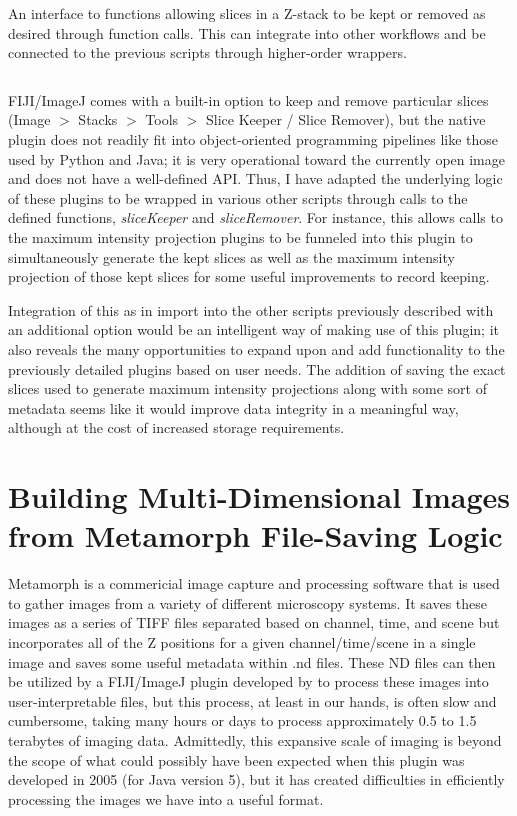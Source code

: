 \begin{code}
\caption{An interface to functions allowing slices in a Z\hyp{}stack to be kept or removed as desired through function calls. This can integrate into other workflows and be connected to the previous scripts through higher\hyp{}order wrappers.}
\label{reslicer}

\inputminted[breaklines,frame=single,fontsize=\small]{python}{source/reSlicer.py}

\end{code}

FIJI/ImageJ comes with a built\hyp{}in option to keep and remove particular slices (Image $>$ Stacks $>$ Tools $>$ Slice Keeper / Slice Remover), but the native plugin does not readily fit into object\hyp{}oriented programming pipelines like those used by Python and Java; it is very operational toward the currently open image and does not have a well\hyp{}defined API. Thus, I have adapted the underlying logic of these plugins to be wrapped in various other scripts through calls to the defined functions, \textit{sliceKeeper} and \textit{sliceRemover}. For instance, this allows calls to the maximum intensity projection plugins to be funneled into this plugin to simultaneously generate the kept slices as well as the maximum intensity projection of those kept slices for some useful improvements to record keeping. 

Integration of this as in import into the other scripts previously described with an additional option would be an intelligent way of making use of this plugin; it also reveals the many opportunities to expand upon and add functionality to the previously detailed plugins based on user needs. The addition of saving the exact slices used to generate maximum intensity projections along with some sort of metadata seems like it would improve data integrity in a meaningful way, although at the cost of increased storage requirements.

\section{Building Multi\hyp{}Dimensional Images from Metamorph File\hyp{}Saving Logic}\label{metamorph}

Metamorph is a commericial image capture and processing software that is used to gather images from a variety of different microscopy systems. It saves these images as a series of TIFF files separated based on channel, time, and scene but incorporates all of the Z positions for a given channel/time/scene in a single image and saves some useful metadata within .nd files. These ND files can then be utilized by a FIJI/ImageJ plugin developed by \citet{Cordelieres2005} to process these images into user\hyp{}interpretable files, but this process, at least in our hands, is often slow and cumbersome, taking many hours or days to process approximately 0.5 to 1.5 terabytes of imaging data. Admittedly, this expansive scale of imaging is beyond the scope of what could possibly have been expected when this plugin was developed in 2005 (for Java version 5), but it has created difficulties in efficiently processing the images we have into a useful format. 

